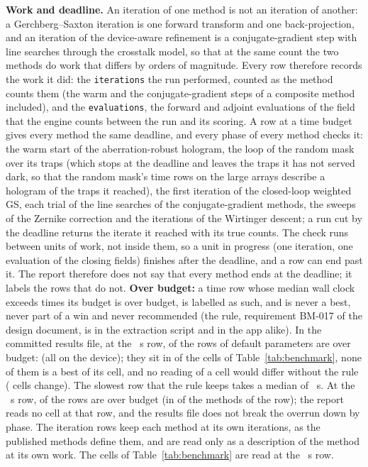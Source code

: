 \textbf{Work and deadline.} An iteration of one method is not an iteration of another: a Gerchberg--Saxton iteration is one forward transform and one back-projection, and an iteration of the device-aware refinement is a conjugate-gradient step with line searches through the crosstalk model, so that at the same count the two methods do work that differs by orders of magnitude. Every row therefore records the work it did: the \texttt{iterations} the run performed, counted as the method counts them (the warm and the conjugate-gradient steps of a composite method included), and the \texttt{evaluations}, the forward and adjoint evaluations of the field that the engine counts between the run and its scoring. A row at a time budget gives every method the same deadline, and every phase of every method checks it: the warm start of the aberration-robust hologram, the loop of the random mask over its traps (which stops at the deadline and leaves the traps it has not served dark, so that the random mask's time rows on the large arrays describe a hologram of the traps it reached), the first iteration of the closed-loop weighted GS, each trial of the line searches of the conjugate-gradient methods, the sweeps of the Zernike correction and the iterations of the Wirtinger descent; a run cut by the deadline returns the iterate it reached with its true counts. The check runs between units of work, not inside them, so a unit in progress (one iteration, one evaluation of the closing fields) finishes after the deadline, and a row can end past it. The report therefore does not say that every method ends at the deadline; it labels the rows that do not. \textbf{Over budget:} a time row whose median wall clock exceeds \dlFactor{} times its budget is over budget, is labelled as such, and is never a best, never part of a win and never recommended (the rule, requirement BM-017 of the design document, is in the extraction script and in the app alike). In the committed results file, at the \dlReadS{}~s row, \dlOverRead{} of the \dlRowsRead{} rows of default parameters are over budget: \dlOverList{} (all on the \dlOverDevices{} device); they sit in \dlCellsOver{} of the \dlCellsAll{} cells of Table~\ref{tab:benchmark}, none of them is a best of its cell, and no reading of a cell would differ without the rule (\dlCellsChanged{} cells change). The slowest row that the rule keeps takes a median of \dlMaxKept{}~s. At the \dlShortS{}~s row, \dlOverShort{} of the \dlRowsShort{} rows are over budget (in \dlOverMethodsShort{} of the \dlMethodsShort{} methods of the row); the report reads no cell at that row, and the results file does not break the overrun down by phase. The iteration rows keep each method at its own iterations, as the published methods define them, and are read only as a description of the method at its own work. The cells of Table~\ref{tab:benchmark} are read at the \dlReadS{}~s row.

